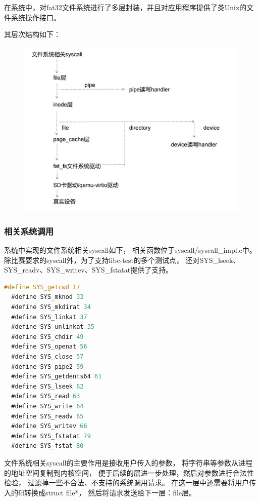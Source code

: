 \documentclass[UTF8,a4paper,10pt]{ctexart}
\begin{document}
在系统中，对fat32文件系统进行了多层封装，并且对应用程序提供了类Unix的文件系统操作接口。

其层次结构如下：

\begin{figure}[H]
  \centering
  \includegraphics[scale=0.5]{image/file01.jpg}
\end{figure}

\subsubsection{相关系统调用}

系统中实现的文件系统相关syscall如下，
相关函数位于syscall/syscall\_impl.c中。
除比赛要求的syscall外，为了支持libc-test的多个测试点，
还对SYS\_lseek、SYS\_readv、SYS\_writev、SYS\_fstatat提供了支持。

\begin{lstlisting}[title=文件系统相关先系统调用,frame=trbl,language={C}]
  #define SYS_getcwd 17
  #define SYS_mknod 33
  #define SYS_mkdirat 34
  #define SYS_linkat 37
  #define SYS_unlinkat 35
  #define SYS_chdir 49
  #define SYS_openat 56
  #define SYS_close 57
  #define SYS_pipe2 59
  #define SYS_getdents64 61
  #define SYS_lseek 62
  #define SYS_read 63
  #define SYS_write 64
  #define SYS_readv 65
  #define SYS_writev 66
  #define SYS_fstatat 79
  #define SYS_fstat 80
  \end{lstlisting}

  文件系统相关syscall的主要作用是接收用户传入的参数，
  将字符串等参数从进程的地址空间复制到内核空间，
  便于后续的层进一步处理，然后对参数进行合法性检验，
  过滤掉一些不合法、不支持的系统调用请求。
  在这一层中还需要将用户传入的fd转换成struct file*，
  然后将请求发送给下一层：file层。
  
\end{document}
